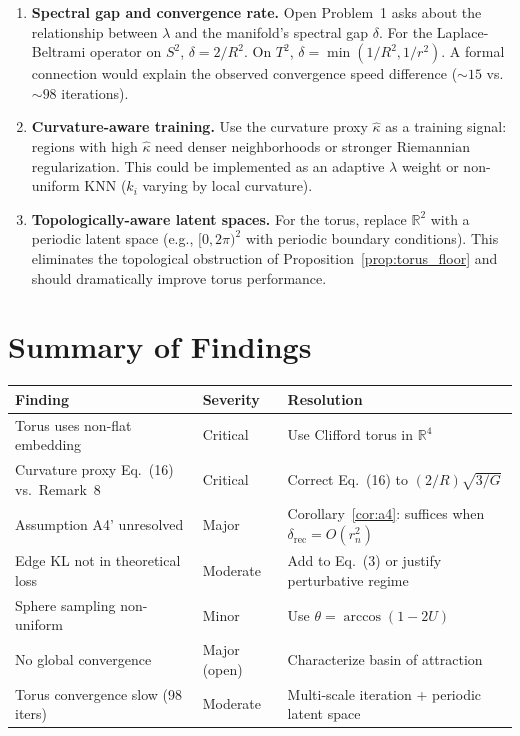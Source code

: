 \documentclass{article}
\newcommand{\RR}{\mathbb{R}}
\begin{document}
\begin{enumerate}[label=\textbf{N\arabic*.}]
    \item \textbf{Spectral gap and convergence rate.}
      Open Problem~1 asks about the relationship between $\lambda$ and the
      manifold's spectral gap $\delta$. For the Laplace-Beltrami operator on
      $S^2$, $\delta = 2/R^2$. On $T^2$, $\delta = \min(1/R^2, 1/r^2)$. A
      formal connection would explain the observed convergence speed difference
      ($\sim15$ vs.\ $\sim98$ iterations).

    \item \textbf{Curvature-aware training.}
      Use the curvature proxy $\hat{\kappa}$ as a training signal: regions with
      high $\hat{\kappa}$ need denser neighborhoods or stronger Riemannian
      regularization. This could be implemented as an adaptive $\lambda$
      weight or non-uniform KNN ($k_i$ varying by local curvature).

    \item \textbf{Topologically-aware latent spaces.}
      For the torus, replace $\RR^2$ with a periodic latent space (e.g.,
      $[0, 2\pi)^2$ with periodic boundary conditions). This eliminates the
      topological obstruction of Proposition~\ref{prop:torus_floor} and should
      dramatically improve torus performance.
\end{enumerate}


\section{Summary of Findings}
\label{sec:summary}

\begin{center}
\small
\begin{tabular}{p{4.5cm}p{2cm}p{7cm}}
\hline
\textbf{Finding} & \textbf{Severity} & \textbf{Resolution} \\
\hline
Torus uses non-flat embedding &
  Critical &
  Use Clifford torus in $\RR^4$ \\
Curvature proxy Eq.~(16) vs.\ Remark~8 &
  Critical &
  Correct Eq.~(16) to $(2/R)\sqrt{3/G}$ \\
Assumption A4' unresolved &
  Major &
  Corollary~\ref{cor:a4}: suffices when $\delta_{\mathrm{rec}} = O(r_n^2)$ \\
Edge KL not in theoretical loss &
  Moderate &
  Add to Eq.~(3) or justify perturbative regime \\
Sphere sampling non-uniform &
  Minor &
  Use $\theta = \arccos(1-2U)$ \\
No global convergence &
  Major (open) &
  Characterize basin of attraction \\
Torus convergence slow (98 iters) &
  Moderate &
  Multi-scale iteration + periodic latent space \\
\hline
\end{tabular}
\end{center}
\end{document}

